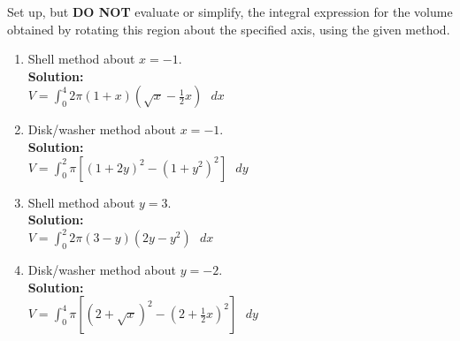 \documentclass[paper=a4, fontsize=11pt]{scrartcl} %
\numberwithin{equation}{section} %
\numberwithin{figure}{section} %
\numberwithin{table}{section} %
\begin{document}
\begin{enumerate}
Set up, but \textbf{DO NOT} evaluate or simplify, the integral expression for the volume obtained by rotating this region about the specified axis, using the given method.\\
\begin{enumerate}
\item Shell method about $x=-1$.\\
\noindent\textbf{Solution:}\\
$ V = \boxed{ \int_0^4 2 \pi (1+x) \left( \sqrt{x} - \frac{1}{2}x \right) \text{  } dx}$
\item Disk/washer method about $x=-1$.\\
\noindent\textbf{Solution:}\\
$V = \boxed{\int_0^2 \pi \left[ (1+2y)^2 - (1+y^2)^2 \right] \text{  } dy}$
\item Shell method about $y=3$.\\
\noindent\textbf{Solution:}\\
$V =\boxed{\int_0^2 2 \pi (3-y)(2y-y^2) \text{  } dx}$
\item Disk/washer method about $y=-2$.\\
\noindent\textbf{Solution:}\\
$V = \boxed{\int_0^4  \pi  \left[ (2+\sqrt{x})^2 - \left (2+\frac{1}{2}x \right)^2 \right] \text{  } dy}$
\end{enumerate}




\end{enumerate}

\end{document}

